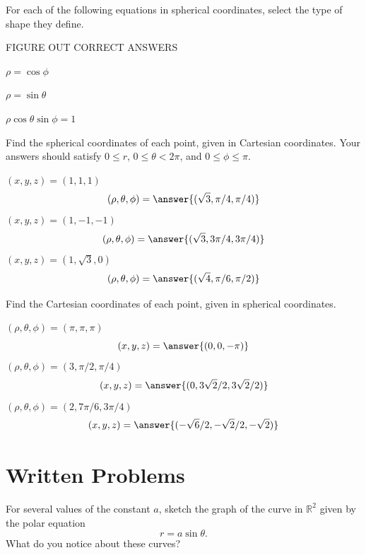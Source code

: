 \documentclass{ximera}
\begin{document}
\begin{problem}
For each of the following equations in spherical coordinates, select the type of shape they define.

FIGURE OUT CORRECT ANSWERS

$\rho = \cos\phi$
\begin{multipleChoice}
\end{multipleChoice}

$\rho = \sin\theta$
\begin{multipleChoice}
\end{multipleChoice}

$\rho\cos\theta\sin\phi = 1$
\begin{multipleChoice}
\end{multipleChoice}
\end{problem}

\begin{problem}
Find the spherical coordinates of each point, given in Cartesian coordinates. Your answers should satisfy $0\leq r$, $0\leq\theta < 2\pi$, and $0\leq \phi\leq \pi$.

$(x,y,z) = (1,1,1)$
\[
(\rho,\theta,\phi) = \answer{(\sqrt{3}, \pi/4, \pi/4)}
\]
$(x,y,z) = (1, -1, -1)$
\[
(\rho,\theta,\phi) = \answer{(\sqrt{3}, 3\pi/4, 3\pi/4)}
\]
$(x,y,z) = (1,\sqrt{3},0)$
\[
(\rho,\theta,\phi) = \answer{(\sqrt{4}, \pi/6, \pi/2)}
\]
\end{problem}

\begin{problem}
Find the Cartesian coordinates of each point, given in spherical coordinates.

$(\rho,\theta,\phi) = (\pi,\pi,\pi)$
\[
(x,y,z) = \answer{(0, 0, -\pi)}
\]
$(\rho,\theta,\phi) = (3,\pi/2,\pi/4)$
\[
(x,y,z) = \answer{(0, 3\sqrt{2}/2, 3\sqrt{2}/2)}
\]
$(\rho,\theta,\phi) = (2,7\pi/6,3\pi/4)$
\[
(x,y,z) = \answer{(-\sqrt{6}/2, -\sqrt{2}/2, -\sqrt{2})}
\]

\end{problem}


\section{Written Problems}
\begin{problem}
For several values of the constant $a$, sketch the graph of the curve in $\mathbb{R}^2$ given by the polar equation
\[
r = a\sin\theta .
\]
What do you notice about these curves?
\end{problem}
\end{document}
